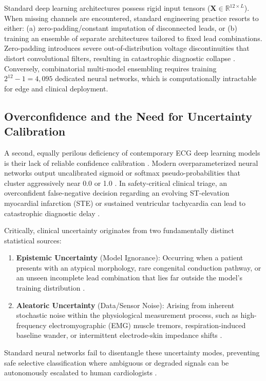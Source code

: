 \documentclass[journal]{IEEEtran}
\begin{document}
Standard deep learning architectures possess rigid input tensors ($\mathbf{X} \in \mathbb{R}^{12 \times L}$). When missing channels are encountered, standard engineering practice resorts to either: (a) zero-padding/constant imputation of disconnected leads, or (b) training an ensemble of separate architectures tailored to fixed lead combinations. Zero-padding introduces severe out-of-distribution voltage discontinuities that distort convolutional filters, resulting in catastrophic diagnostic collapse \cite{ref_15}. Conversely, combinatorial multi-model ensembling requires training $2^{12} - 1 = 4,095$ dedicated neural networks, which is computationally intractable for edge and clinical deployment.

\subsection{Overconfidence and the Need for Uncertainty Calibration}
A second, equally perilous deficiency of contemporary ECG deep learning models is their lack of reliable confidence calibration \cite{ref_16}. Modern overparameterized neural networks output uncalibrated sigmoid or softmax pseudo-probabilities that cluster aggressively near 0.0 or 1.0 \cite{ref_17}. In safety-critical clinical triage, an overconfident false-negative decision regarding an evolving ST-elevation myocardial infarction (STE) or sustained ventricular tachycardia can lead to catastrophic diagnostic delay \cite{ref_18}. 

Critically, clinical uncertainty originates from two fundamentally distinct statistical sources:
\begin{enumerate}
    \item \textbf{Epistemic Uncertainty} (Model Ignorance): Occurring when a patient presents with an atypical morphology, rare congenital conduction pathway, or an unseen incomplete lead combination that lies far outside the model's training distribution \cite{ref_19}.
    \item \textbf{Aleatoric Uncertainty} (Data/Sensor Noise): Arising from inherent stochastic noise within the physiological measurement process, such as high-frequency electromyographic (EMG) muscle tremors, respiration-induced baseline wander, or intermittent electrode-skin impedance shifts \cite{ref_20}.
\end{enumerate}
Standard neural networks fail to disentangle these uncertainty modes, preventing safe selective classification where ambiguous or degraded signals can be autonomously escalated to human cardiologists \cite{ref_21,ref_22}.
\end{document}

